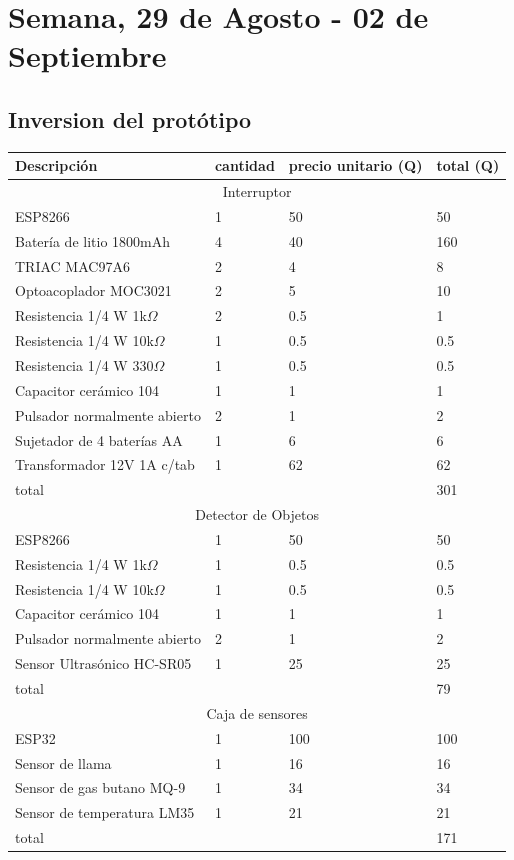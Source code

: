 \documentclass[oneside]{article}
\begin{document}
\section*{Semana, 29 de Agosto - 02 de Septiembre}
\subsection*{Inversion del protótipo}

\begin{table}[H]
\centering
\begin{longtable}[c]{llll}
\toprule
Descripción & cantidad & precio unitario (Q) & total (Q) \\
\midrule
\multicolumn{4}{c}{Interruptor}\\
\hline
ESP8266 & 1 & 50 & 50 \\
Batería de litio 1800mAh & 4 & 40 & 160 \\ 
TRIAC MAC97A6 & 2 & 4 & 8 \\
Optoacoplador MOC3021 & 2 & 5 & 10 \\
Resistencia 1/4 W 1k$\Omega$ & 2 & 0.5 & 1 \\
Resistencia 1/4 W 10k$\Omega$ & 1 & 0.5 & 0.5 \\
Resistencia 1/4 W 330$\Omega$ & 1 & 0.5 & 0.5 \\
Capacitor cerámico 104 & 1 & 1 & 1 \\
Pulsador normalmente abierto & 2 & 1 & 2 \\
Sujetador de 4 baterías AA & 1 & 6 & 6 \\
Transformador 12V 1A c/tab & 1 & 62 & 62 \\
\hline
total & & & 301\\
\hline
\multicolumn{4}{c}{Detector de Objetos}\\
\hline
ESP8266 & 1 & 50 & 50 \\
Resistencia 1/4 W 1k$\Omega$ & 1 & 0.5 & 0.5 \\
Resistencia 1/4 W 10k$\Omega$ & 1 & 0.5 & 0.5 \\
Capacitor cerámico 104 & 1 & 1 & 1 \\
Pulsador normalmente abierto & 2 & 1 & 2 \\
Sensor Ultrasónico HC-SR05 & 1 & 25 & 25 \\
\hline
total & & & 79\\
\hline
\multicolumn{4}{c}{Caja de sensores}\\
\hline
ESP32 & 1 & 100 & 100 \\
Sensor de llama & 1 & 16 & 16 \\
Sensor de gas butano MQ-9 & 1 & 34 & 34 \\
Sensor de temperatura LM35 & 1 & 21 & 21 \\
\hline
total & & & 171\\
\hline


\end{longtable}
\end{table}
\end{document}

